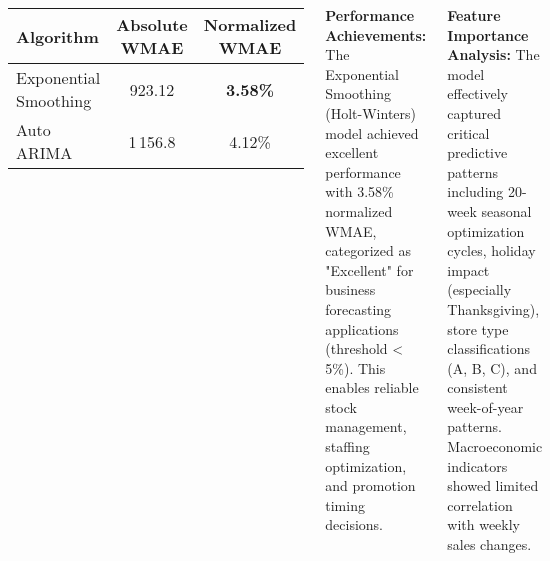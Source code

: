 \documentclass[25pt,a0paper,portrait]{tikzposter}
\begin{document}
\begin{columns}
{			\begin{center}
				\begin{tabular}{lcc}
					\toprule
					\textbf{Algorithm} & \textbf{Absolute WMAE} & \textbf{Normalized WMAE} \\
					\midrule
					Exponential Smoothing & 923.12 & \textbf{3.58\%} \\
					Auto ARIMA & 1\,156.8 & 4.12\% \\
					\bottomrule
				\end{tabular}
			\end{center}
			
			\textbf{Performance Achievements:}
			The Exponential Smoothing (Holt-Winters) model achieved excellent performance with 3.58\% normalized WMAE, categorized as "Excellent" for business forecasting applications (threshold < 5\%). This enables reliable stock management, staffing optimization, and promotion timing decisions.
			
			\textbf{Feature Importance Analysis:}
			The model effectively captured critical predictive patterns including 20-week seasonal optimization cycles, holiday impact (especially Thanksgiving), store type classifications (A, B, C), and consistent week-of-year patterns. Macroeconomic indicators showed limited correlation with weekly sales changes.
			

		}
		
\end{columns}
\end{document}
